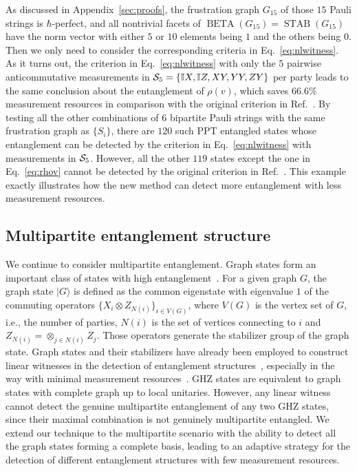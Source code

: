 \documentclass[
12pt,
prx,
aps,
reprint,
a4paper,
longbibliograph,
nofootinbib,
nobibnotes,
superscriptaddress
]{revtex4-2}
\theoremstyle{definition}
\def\id{\mathbb{I}}%
\def\stab{\operatorname{STAB}}
\def\be{\operatorname{BETA}}
\begin{document}
As discussed in Appendix~\ref{sec:proofs}, the frustration graph $G_{15}$ of those $15$ Pauli strings is $\hbar$-perfect, and all nontrivial facets of $\be(G_{15}) = \stab(G_{15})$ have the norm vector with either $5$ or $10$ elements being $1$ and the others being $0$. Then we only need to consider the corresponding criteria in Eq.~\eqref{eq:nlwitness}. As it turns out, the criterion in Eq.~\eqref{eq:nlwitness} with only the $5$ pairwise anticommutative measurements in ${\cal S}_5 =\{\id X, \id Z, XY, YY, ZY\}$ per party leads to the same conclusion about the entanglement of $\rho(v)$, which saves $66.6\%$ measurement resources in comparison with the original criterion in Ref.~\cite{de2023uncertainty}.
By testing all the other combinations of $6$ bipartite Pauli strings with the same frustration graph as $\{S_i\}$, there are $120$ such PPT entangled states whose entanglement can be detected by the criterion in Eq.~\eqref{eq:nlwitness} with measurements in ${\cal S}_5$. However, all the other $119$ states except the one in Eq.~\eqref{eq:rhov} cannot be detected by the original criterion in Ref.~\cite{de2023uncertainty}.
This example exactly illustrates how the new method can detect more entanglement with less measurement resources.
\subsection{Multipartite entanglement structure}
We continue to consider multipartite entanglement.
Graph states form an important class of states with high entanglement~\cite{hein2006entanglement}. For a given graph $G$, the graph state $|G\rangle$ is defined as the common eigenstate with eigenvalue $1$ of the commuting operators $\{X_i\otimes Z_{N(i)}\}_{i\in V(G)}$, where $V(G)$ is the vertex set of $G$, i.e., the number of parties, $N(i)$ is the set of vertices connecting to $i$ and $Z_{N(i)} = \otimes_{j\in N(i)} Z_j$. Those operators generate the stabilizer group of the graph state.
Graph states and their stabilizers have already been employed to construct linear witnesses in the detection of entanglement structures~\cite{jungnitsch2011entanglement}, especially in the way with minimal measurement resources~\cite{toth2005detecting,zhou2019detecting}.
GHZ states are equivalent to graph states with complete graph up to local unitaries.
However, any linear witness cannot detect the genuine multipartite entanglement of any two GHZ states, since their maximal combination is not genuinely multipartite entangled.
We extend our technique to the multipartite scenario with the ability to detect all the graph states forming a complete basis, leading to an adaptive strategy for the detection of different entanglement structures with few measurement resources.
\end{document}
